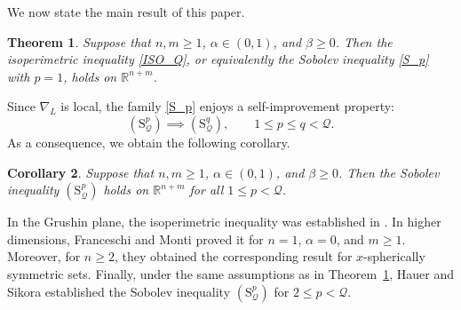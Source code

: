 \documentclass[12pt]{amsart}
\theoremstyle{plain}
\newtheorem{theorem}{Theorem}[section]
\newtheorem{corollary}[theorem]{Corollary}
\theoremstyle{definition}
\numberwithin{equation}{section}
\begin{document}




We now state the main result of this paper.

\begin{theorem}\label{thm_ISO}
Suppose that \(n,m\ge 1\), \(\alpha\in(0,1)\), and \(\beta\ge 0\). Then the isoperimetric inequality \eqref{ISO_Q}, or equivalently the Sobolev inequality \eqref{S_p} with \(p=1\), holds on \(\mathbb{R}^{n+m}\).
\end{theorem}

Since \(\nabla_L\) is local, the family \eqref{S_p} enjoys a self-improvement property:
\[
(\mathrm{S}_{\mathcal Q}^p)\implies (\mathrm{S}_{\mathcal Q}^q),
\qquad 1\le p\le q<\mathcal Q.
\]
As a consequence, we obtain the following corollary.

\begin{corollary}\label{thm_S_p}
Suppose that \(n,m\ge 1\), \(\alpha\in(0,1)\), and \(\beta\ge 0\). Then the Sobolev inequality \((\mathrm{S}_{\mathcal Q}^p)\) holds on \(\mathbb{R}^{n+m}\) for all \(1\le p<\mathcal Q\).
\end{corollary}

In the Grushin plane, the isoperimetric inequality was established in \cite{MM}. In higher dimensions, Franceschi and Monti \cite{FM} proved it for \(n=1\), \(\alpha=0\), and \(m\ge 1\). Moreover, for \(n\ge 2\), they obtained the corresponding result for \(x\)-spherically symmetric sets. Finally, under the same assumptions as in Theorem~\ref{thm_ISO}, Hauer and Sikora \cite[Theorem 6.3]{HS} established the Sobolev inequality \((\mathrm{S}_{\mathcal Q}^p)\) for \(2\le p<\mathcal Q\).
\end{document}
